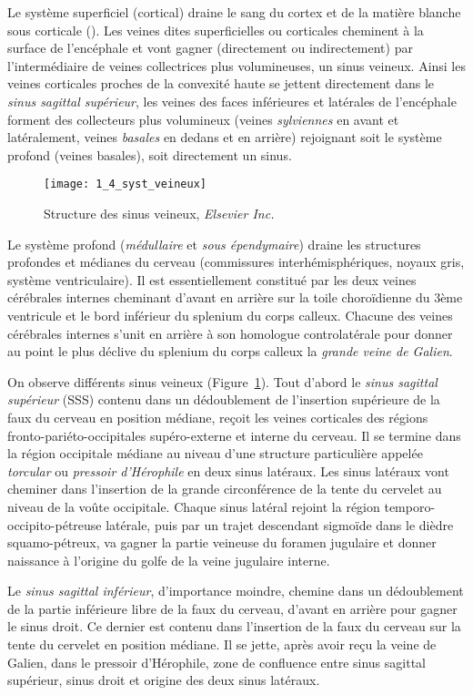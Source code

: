 Le système superficiel (cortical) draine le sang du cortex et de la matière blanche sous corticale (\cite{Aydin1997}). Les veines dites superficielles ou corticales cheminent à la surface de l’encéphale et vont gagner (directement ou indirectement) par l’intermédiaire de veines collectrices plus volumineuses, un sinus veineux. Ainsi les veines corticales proches de la convexité haute se jettent directement dans le {\em sinus sagittal supérieur}, les veines des faces inférieures et latérales de l’encéphale forment des collecteurs plus volumineux (veines {\em sylviennes} en avant et latéralement, veines {\em basales} en dedans et en arrière) rejoignant soit le système profond (veines basales), soit directement un sinus.

\begin{figure}[!t]
\centering
\texttt{[image: 1\_4\_syst\_veineux]}
\caption{Structure des sinus veineux, {\em Elsevier Inc.} }
\label{fig:1_4_syst_veineux}	
\end{figure}
Le système profond ({\em médullaire} et {\em sous épendymaire}) draine les structures profondes et médianes du cerveau (commissures interhémisphériques, noyaux gris, système ventriculaire). Il est essentiellement constitué par les deux veines cérébrales internes cheminant d’avant en arrière sur la toile choroïdienne du 3ème ventricule et le bord inférieur du splenium du corps calleux. Chacune des veines cérébrales internes s’unit en arrière à son homologue controlatérale pour donner au point le plus déclive du splenium du corps calleux la {\em grande veine de Galien}.

On observe différents sinus veineux (Figure~\ref{fig:1_4_syst_veineux}). Tout d’abord le {\em sinus sagittal supérieur} (SSS) contenu dans un dédoublement de l’insertion supérieure de la faux du cerveau en position médiane, reçoit les veines corticales des régions fronto-pariéto-occipitales supéro-externe et interne du cerveau. Il se termine dans la région occipitale médiane au niveau d’une structure particulière appelée {\em torcular} ou {\em pressoir d’Hérophile} en deux sinus latéraux. Les sinus latéraux vont cheminer dans l’insertion de la grande circonférence de la tente du cervelet au niveau de la voûte occipitale. Chaque sinus latéral rejoint la région temporo-occipito-pétreuse latérale, puis par un trajet descendant sigmoïde dans le dièdre squamo-pétreux, va gagner la partie veineuse du foramen jugulaire et donner naissance à l’origine du golfe de la veine jugulaire interne.

Le {\em sinus sagittal inférieur}, d’importance moindre, chemine dans un dédoublement de la partie inférieure libre de la faux du cerveau, d’avant en arrière pour gagner le sinus droit. Ce dernier est contenu dans l’insertion de la faux du cerveau sur la tente du cervelet en position médiane. Il se jette, après avoir reçu la veine de Galien, dans le pressoir d’Hérophile, zone de confluence entre sinus sagittal supérieur, sinus droit et origine des deux sinus latéraux.

